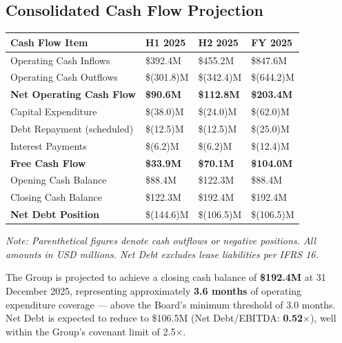 \vspace{8pt}

\subsection{Consolidated Cash Flow Projection}

\vspace{4pt}
\begin{center}
\renewcommand{\arraystretch}{1.38}
\begin{tabular}{L{5.8cm} R{2.2cm} R{2.2cm} R{2.2cm}}
  \toprule
  \color{white}\textbf{Cash Flow Item} &
  \color{white}\textbf{H1 2025} &
  \color{white}\textbf{H2 2025} &
  \color{white}\textbf{FY 2025} \\
  \midrule
  Operating Cash Inflows                 & \$392.4M & \$455.2M & \$847.6M \\
  Operating Cash Outflows                & \$(301.8)M & \$(342.4)M & \$(644.2)M \\
  \textbf{Net Operating Cash Flow}       & \textbf{\$90.6M} & \textbf{\$112.8M} & \textbf{\$203.4M} \\
  \midrule
  Capital Expenditure                    & \$(38.0)M & \$(24.0)M & \$(62.0)M \\
  Debt Repayment (scheduled)             & \$(12.5)M & \$(12.5)M & \$(25.0)M \\
  Interest Payments                      & \$(6.2)M  & \$(6.2)M  & \$(12.4)M \\
  \textbf{Free Cash Flow}                & \textbf{\$33.9M} & \textbf{\$70.1M} & \textbf{\$104.0M} \\
  \midrule
  Opening Cash Balance                   & \$88.4M  & \$122.3M & \$88.4M  \\
  Closing Cash Balance                   & \$122.3M & \$192.4M & \$192.4M \\
  \midrule
  \textbf{Net Debt Position}             & \$(144.6)M & \$(106.5)M & \$(106.5)M \\
  \bottomrule
\end{tabular}
\end{center}

\vspace{6pt}
{\small\color{SlateGray}\textit{Note: Parenthetical figures denote cash outflows or negative positions.
  All amounts in USD millions. Net Debt excludes lease liabilities per IFRS 16.}}

\vspace{8pt}

The Group is projected to achieve a closing cash balance of \textbf{\$192.4M} at
31 December 2025, representing approximately \textbf{3.6 months} of operating
expenditure coverage — above the Board's minimum threshold of 3.0 months.
Net Debt is expected to reduce to \$106.5M (Net Debt/EBITDA: \textbf{0.52$\times$}),
well within the Group's covenant limit of 2.5$\times$.
